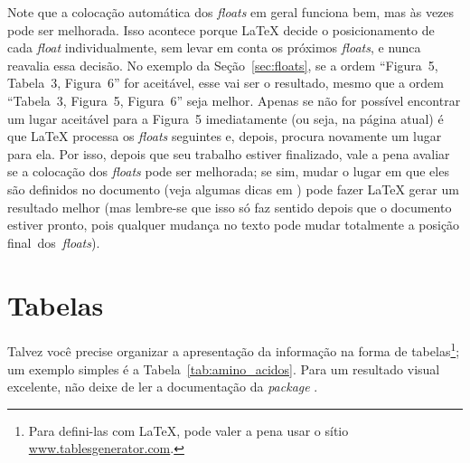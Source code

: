 Note que a colocação automática dos \emph{floats} em geral funciona bem,
mas às vezes pode ser melhorada. Isso acontece porque \LaTeX{} decide o
posicionamento de cada \emph{float} individualmente, sem levar em conta
os próximos \emph{floats}, e nunca reavalia essa decisão. No exemplo da
Seção~\ref{sec:floats}, se a ordem ``Figura~5, Tabela~3, Figura~6'' for
aceitável, esse vai ser o resultado, mesmo que a ordem ``Tabela~3, Figura~5,
Figura~6'' seja melhor. Apenas se não for possível encontrar um lugar
aceitável para a Figura~5 imediatamente (ou seja, na página atual) é que
\LaTeX{} processa os \emph{floats} seguintes e, depois, procura novamente
um lugar para ela. Por isso, depois que seu trabalho estiver finalizado,
vale a pena avaliar se a colocação dos \emph{floats} pode ser melhorada;
se sim, mudar o lugar em que eles são definidos no documento (veja algumas
dicas em \cite{floats2014}) pode fazer \LaTeX{} gerar um resultado melhor
(mas lembre-se que isso só faz sentido depois que o documento estiver
pronto, pois qualquer mudança no texto pode mudar totalmente a posição
final~dos~\emph{floats}).

\section{Tabelas}

Talvez você precise organizar a apresentação da informação na forma de
tabelas\footnote{Para defini-las com \LaTeX{}, pode valer a pena
usar o sítio \url{www.tablesgenerator.com}.};
um exemplo simples é a Tabela~\ref{tab:amino_acidos}. Para um resultado visual
excelente, não deixe de ler a documentação da \emph{package} .



